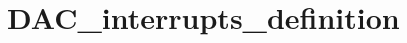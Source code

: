 \hypertarget{group___d_a_c__interrupts__definition}{\section{D\-A\-C\-\_\-interrupts\-\_\-definition}
\label{group___d_a_c__interrupts__definition}
}
